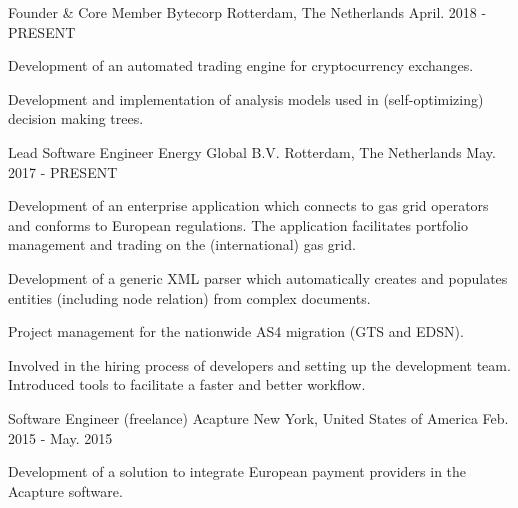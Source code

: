 

\begin{cventries}

  \cventry
    {Founder \& Core Member} %
    {Bytecorp} %
    {Rotterdam, The Netherlands} %
    {April. 2018 - PRESENT} %
    {
      \begin{cvitems} %
        \item {Development of an automated trading engine for cryptocurrency exchanges.}
        \item {Development and implementation of analysis models used in (self-optimizing) decision making trees.}
      \end{cvitems}
    }

  \cventry
    {Lead Software Engineer} %
    {Energy Global B.V.} %
    {Rotterdam, The Netherlands} %
    {May. 2017 - PRESENT} %
    {
      \begin{cvitems} %
      	\item {Development of an enterprise application which connects to gas grid operators and conforms to European regulations. \newline The application facilitates portfolio management and trading on the (international) gas grid.}
        \item {Development of a generic XML parser which automatically creates and populates entities (including node relation) from complex documents.}
        \item {Project management for the nationwide AS4 migration (GTS and EDSN).}
        \item {Involved in the hiring process of developers and setting up the development team. Introduced tools to facilitate a faster and better workflow.}
      \end{cvitems}
    }

  \cventry
    {Software Engineer (freelance)} %
    {Acapture} %
    {New York, United States of America} %
    {Feb. 2015 - May. 2015} %
    {
      \begin{cvitems} %
        \item {Development of a solution to integrate European payment providers in the Acapture software.}
      \end{cvitems}
    }
  

\end{cventries}
